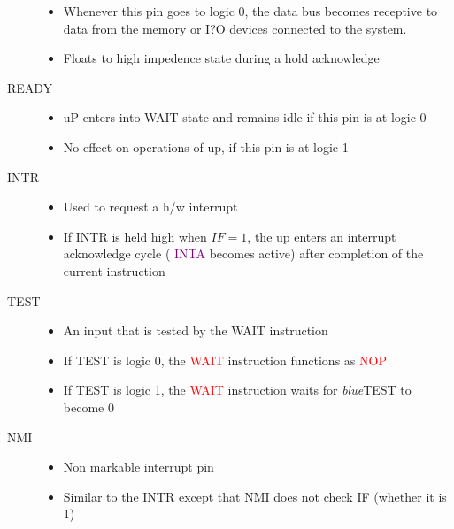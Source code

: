 \documentclass{book}
\begin{document}
\begin{description}
    \item[]
    \begin{itemize}
        \item  Whenever this pin goes to logic 0, the data bus becomes receptive to data from the memory or I?O devices
            connected to the system.
        \item Floats to high impedence state during a hold acknowledge
    \end{itemize}

    \item[READY]
    \begin{itemize}
        \item uP enters into WAIT state and remains idle if this pin is at logic 0
        \item No effect on operations of up, if this pin is at logic 1
    \end{itemize}


    \item[INTR]
    \begin{itemize}
        \item  Used to request a h/w interrupt
        \item  If INTR is held high when $IF = 1$, the up enters an interrupt acknowledge cycle
        ( \textcolor{purple}{INTA} becomes active) after completion of the current instruction
    \end{itemize}

    \item[TEST]
    \begin{itemize}
        \item  An input that is tested by the WAIT instruction
        \item  If TEST is logic 0, the \textcolor{red}{WAIT} instruction functions as \textcolor{red}{NOP}
        \item If TEST is logic 1, the \textcolor{red}{WAIT} instruction waits for \textit{blue}{TEST} to become 0


   \end{itemize}

   \item[NMI]
   \begin{itemize}
       \item Non markable interrupt pin
       \item Similar to the INTR except that NMI does not check IF (whether it is 1)

   \end{itemize}


\end{description}
\end{document}

